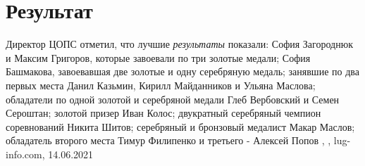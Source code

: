  
 
 
 
 
\chapter{Результат}
\label{sec:slova.rezultat}

Директор ЦОПС отметил, что лучшие \emph{результаты} показали: София Загороднюк и
Максим Григоров, которые завоевали по три золотые медали; София Башмакова,
завоевавшая две золотые и одну серебряную медаль; занявшие по два первых места
Данил Казьмин, Кирилл Майданников и Ульяна Маслова; обладатели по одной золотой
и серебряной медали Глеб Вербовский и Семен Сероштан; золотой призер Иван
Колос; двукратный серебряный чемпион соревнований Никита Шитов; серебряный и
бронзовый медалист Макар Маслов; обладатель второго места Тимур Филипенко и
третьего - Алексей Попов
, 
, lug-info.com, 14.06.2021

